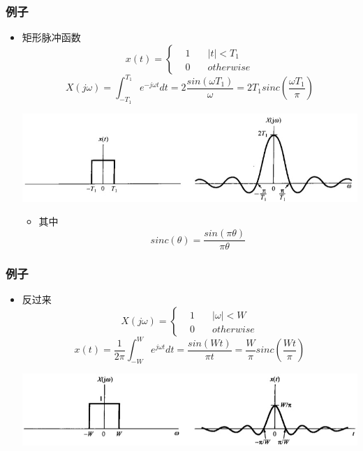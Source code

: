 \documentclass[CJKutf8,xcolor=pdftex,dvipsnames,table]{beamer}
\begin{document}
\begin{CJK*}{UTF8}{song}
\begin{frame}
  \end{frame}     
     
  \begin{frame}
    \frametitle{例子}
    \begin{itemize}
    \item 矩形脉冲函数
    \[
x(t) = 
\left\{
    \begin {aligned}
         & 1 \quad & |t| < T_1 \\
         & 0 \quad & otherwise                  
    \end{aligned}
\right.
	\]
	\[
		X(j\omega) = \int_{-T_1}^{T_1}e^{-j\omega t}dt = 2\frac{sin(\omega T_1)}{\omega}=2T_1sinc(\frac{\omega T_1}{\pi})
	\]
    
    	\begin{center}
      	\includegraphics[scale=.37]{ss-c-f4-8}
    	\end{center}
	
		\begin{itemize}
		\item 其中
    	\[
    		sinc(\theta) = \frac{sin(\pi\theta)}{\pi\theta}
    	\]	
		\end{itemize}
    \end{itemize}

  \end{frame}      
     
  \begin{frame}
    \frametitle{例子}
    \begin{itemize}
    \item 反过来
    \[
X(j\omega) = 
\left\{
    \begin {aligned}
         & 1 \quad & |\omega| < W \\
         & 0 \quad & otherwise                  
    \end{aligned}
\right.
	\]
	\[
		x(t) = \frac{1}{2\pi}\int_{-W}^{W}e^{j\omega t}dt = \frac{sin(W t)}{\pi t} = \frac{W}{\pi}sinc(\frac{Wt}{\pi})
	\]
    
    	\begin{center}
      	\includegraphics[scale=.37]{ss-c-f4-9}
    	\end{center}
	

\end{itemize}
\end{frame}
\end{CJK*}
\end{document}
